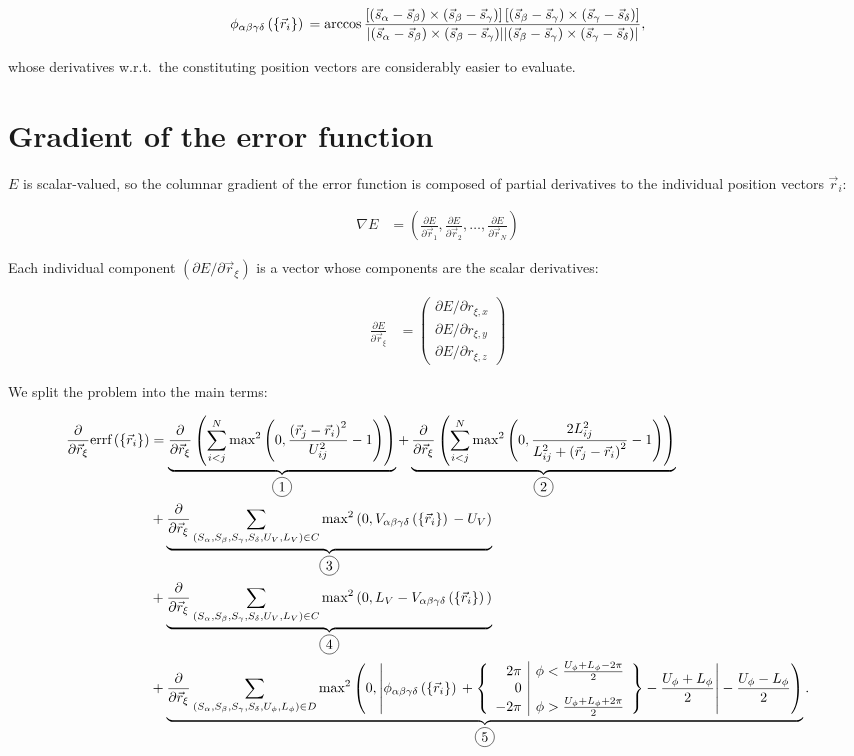 \documentclass[a4paper]{article}
\newcommand*\circled[1]{
  \tikz[baseline=(char.base)]{
    \node[shape=circle,draw,inner sep=2pt] (char) {#1};
  }
}
\begin{document}
\begin{align}\begin{aligned}
  \phi_{\alpha\beta\gamma\delta}\left(\left\{\vec{r}_i \right\}\right){} = \arccos
    \frac{\left[
      \left(\vec{s}_{\alpha}-\vec{s}_{\beta}\right) \times \left(\vec{s}_{\beta}-\vec{s}_{\gamma}\right)
    \right]\left[
      \left(\vec{s}_{\beta}-\vec{s}_{\gamma}\right) \times \left(\vec{s}_{\gamma}-\vec{s}_{\delta}\right)
    \right]}{\lvert
      \left(\vec{s}_{\alpha}-\vec{s}_{\beta}\right) \times \left(\vec{s}_{\beta}-\vec{s}_{\gamma}\right)
    \rvert\lvert
      \left(\vec{s}_{\beta}-\vec{s}_{\gamma}\right) \times \left(\vec{s}_{\gamma}-\vec{s}_{\delta}\right)
    \rvert
    },
\end{aligned}\end{align}

whose derivatives w.r.t.\ the constituting position vectors are considerably
easier to evaluate.

\newpage

\section{Gradient of the error function}

$E$ is scalar-valued, so the columnar gradient of the error function is
composed of partial derivatives to the individual position vectors $\vec{r}_i$:

\begin{align*}
  \nabla E &= \left(
    \frac{\partial E}{\partial \vec{r}_1},
    \frac{\partial E}{\partial \vec{r}_2},
    \ldots,
    \frac{\partial E}{\partial \vec{r}_N}
  \right)
\end{align*}

Each individual component $\left( \partial E / \partial \vec{r}_\xi \right)$
is a vector whose components are the scalar derivatives:

\begin{align*}
  \frac{\partial E}{\partial \vec{r}_\xi} &= \begin{pmatrix}
    \partial E / \partial r_{\xi , x} \\
    \partial E / \partial r_{\xi , y} \\
    \partial E / \partial r_{\xi , z} 
  \end{pmatrix}
\end{align*}

We split the problem into the main terms:

\begin{align*}
  \partialPosVec{\xi} \errf 
  &= \underbrace{\partialPosVec{\xi} \left(
      \ijNSum \distanceErrorFirstTerm{2}
    \right)
  }_{\circled{1}}
  + \underbrace{\partialPosVec{\xi} \left(
      \ijNSum \distanceErrorSecondTerm{2}
    \right)
  }_{\circled{2}}\\
  &+ \underbrace{\partialPosVec{\xi} \chiralSum \chiralErrorFirstTerm{2}
  }_{\circled{3}}\\
  &+ \underbrace{\partialPosVec{\xi} \chiralSum \chiralErrorSecondTerm{2}
  }_{\circled{4}}\\
  &+ \underbrace{\partialPosVec{\xi} \dihedralSum \dihedralTerm{2}
  }_{\circled{5}}.
\end{align*}
\end{document}
